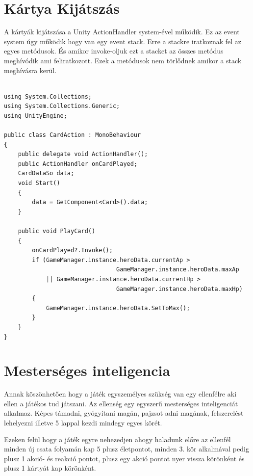 \section{Kártya Kijátszás}
A kártyák kijátszása a Unity ActionHandler system-ével működik. Ez az event system úgy működik hogy van egy event stack. Erre a stackre iratkoznak fel az egyes metódusok. És amikor invoke-oljuk ezt a stacket az összes metódus meghívódik ami feliratkozott. Ezek a metódusok nem törlődnek amikor a stack meghívásra kerül.
\\\
\begin{lstlisting}[language=CSharp,style=CSharpBase,caption={Event kezelő}]
using System.Collections;
using System.Collections.Generic;
using UnityEngine;

public class CardAction : MonoBehaviour
{
    public delegate void ActionHandler();
    public ActionHandler onCardPlayed;
    CardDataSo data;
    void Start()
    {
        data = GetComponent<Card>().data;
    }

    public void PlayCard() 
    {
        onCardPlayed?.Invoke();
        if (GameManager.instance.heroData.currentAp >
                                GameManager.instance.heroData.maxAp 
            || GameManager.instance.heroData.currentHp >
                                GameManager.instance.heroData.maxHp)
        {
            GameManager.instance.heroData.SetToMax();
        }
    }  
}
\end{lstlisting}

\section{Mesterséges inteligencia}
Annak köszönhetően hogy a játék egyszemélyes szükség van egy ellenfélre aki ellen a játékos tud játszani. Az ellenség egy egyszerű mesterséges inteligenciát alkalmaz. Képes támadni, gyógyítani magán, pajzsot adni magának, felszerelést lehelyezni illetve 5 lappal kezdi mindegy egyes körét. 

Ezeken felül hogy a játék egyre nehezedjen ahogy haladunk előre az ellenfél minden új csata folyamán kap 5 plusz életpontot, minden 3. kör alkalmával pedig plusz 1 akció- és reakció pontot, plusz egy akció pontot nyer vissza körönként és plusz 1 kártyát kap körönként.

%